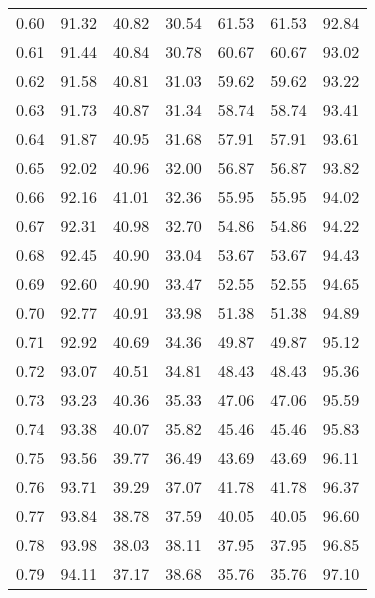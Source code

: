 \begin{tabular}{|c|c|c|c|c|c|c|}
      0.60 &     91.32 &     40.82 &      30.54 &   61.53 &      61.53 &         92.84 \\
      0.61 &     91.44 &     40.84 &      30.78 &   60.67 &      60.67 &         93.02 \\
      0.62 &     91.58 &     40.81 &      31.03 &   59.62 &      59.62 &         93.22 \\
      0.63 &     91.73 &     40.87 &      31.34 &   58.74 &      58.74 &         93.41 \\
      0.64 &     91.87 &     40.95 &      31.68 &   57.91 &      57.91 &         93.61 \\
      0.65 &     92.02 &     40.96 &      32.00 &   56.87 &      56.87 &         93.82 \\
      0.66 &     92.16 &     41.01 &      32.36 &   55.95 &      55.95 &         94.02 \\
      0.67 &     92.31 &     40.98 &      32.70 &   54.86 &      54.86 &         94.22 \\
      0.68 &     92.45 &     40.90 &      33.04 &   53.67 &      53.67 &         94.43 \\
      0.69 &     92.60 &     40.90 &      33.47 &   52.55 &      52.55 &         94.65 \\
      0.70 &     92.77 &     40.91 &      33.98 &   51.38 &      51.38 &         94.89 \\
      0.71 &     92.92 &     40.69 &      34.36 &   49.87 &      49.87 &         95.12 \\
      0.72 &     93.07 &     40.51 &      34.81 &   48.43 &      48.43 &         95.36 \\
      0.73 &     93.23 &     40.36 &      35.33 &   47.06 &      47.06 &         95.59 \\
      0.74 &     93.38 &     40.07 &      35.82 &   45.46 &      45.46 &         95.83 \\
      0.75 &     93.56 &     39.77 &      36.49 &   43.69 &      43.69 &         96.11 \\
      0.76 &     93.71 &     39.29 &      37.07 &   41.78 &      41.78 &         96.37 \\
      0.77 &     93.84 &     38.78 &      37.59 &   40.05 &      40.05 &         96.60 \\
      0.78 &     93.98 &     38.03 &      38.11 &   37.95 &      37.95 &         96.85 \\
      0.79 &     94.11 &     37.17 &      38.68 &   35.76 &      35.76 &         97.10 \\

\end{tabular}
